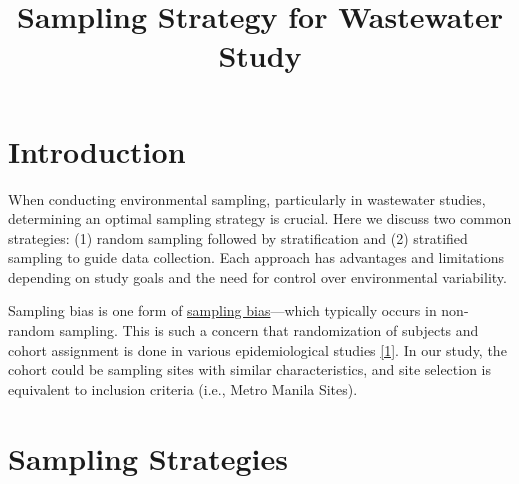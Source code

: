 \documentclass{article}
\title{Sampling Strategy for Wastewater Study}
\author{}
\date{}
\begin{document}
	
	\maketitle
	
	\section{Introduction}
	When conducting environmental sampling, particularly in wastewater studies, determining an optimal sampling strategy is crucial. Here we discuss two common strategies: (1) random sampling followed by stratification and (2) stratified sampling to guide data collection. Each approach has advantages and limitations depending on study goals and the need for control over environmental variability.
	
\begin{tcolorbox}[title=Why randomize? \dotfill Nov 4 2024]
	Sampling bias is one form of \href{https://karger.com/nec/article/115/2/c94/830450/Selection-Bias-and-Information-Bias-in-Clinical}{sampling bias}—which typically occurs in non-random sampling. This is such a concern that randomization of subjects and cohort assignment is done in various epidemiological studies \href{https://www.ncbi.nlm.nih.gov/books/NBK574513/}{[1]}. In our study, the cohort could be sampling sites with similar characteristics, and site selection is equivalent to inclusion criteria (i.e., Metro Manila Sites).
\end{tcolorbox}
	
	\section{Sampling Strategies}
	
\end{document}
